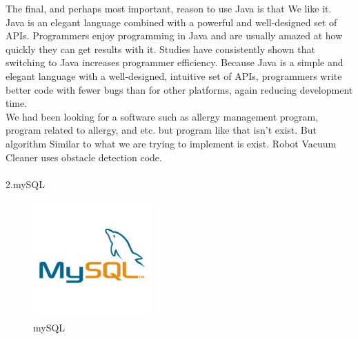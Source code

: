 \documentclass[a4paper,11pt]{IEEEtran}
\begin{document}
{The final, and perhaps most important, reason to use Java is that We like it. Java is an elegant language combined with a powerful and well-designed set of APIs. Programmers enjoy programming in Java and are usually amazed at how quickly they can get results with it. Studies have consistently shown that switching to Java increases programmer efficiency. Because Java is a simple and elegant language with a well-designed, intuitive set of APIs, programmers write better code with fewer bugs than for other platforms, again reducing development time.
~\\
We had been looking for a software such as allergy management program, program related to allergy, and etc. but program like that isn’t exist. But algorithm Similar to what we are trying to implement is exist. Robot Vacuum Cleaner uses obstacle detection code.\\
~\\
2.mySQL
~\\
\begin{figure}[!h]
        \centering
        \includegraphics[width=0.4\textwidth]{mysql.jpg}
        \caption{mySQL}
        \label{fig1}
\end{figure}
~\\
}
\end{document}
